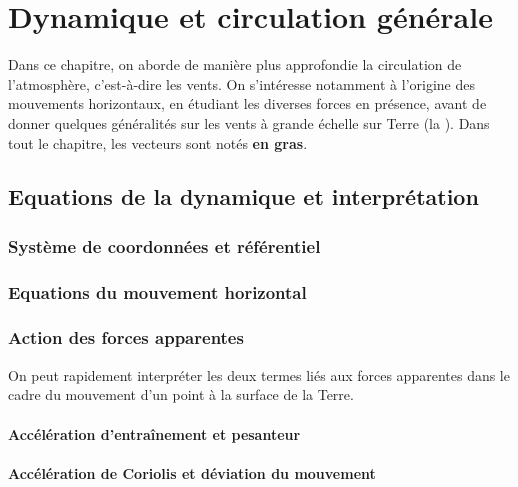 \chapter{Dynamique et circulation générale}


\bk
Dans ce chapitre, on aborde de manière plus approfondie la circulation de l'atmosphère, c'est-à-dire les vents. On s'intéresse notamment à l'origine des mouvements horizontaux, en étudiant les diverses forces en présence, avant de donner quelques généralités sur les vents à grande échelle sur Terre (la ). Dans tout le chapitre, les vecteurs sont notés \textbf{en gras}.

\mk 
\section{Equations de la dynamique et interprétation}

\sk
\subsection{Système de coordonnées et référentiel}

	

\sk
\subsection{Equations du mouvement horizontal}

	

\sk
\subsection{Action des forces apparentes}

\sk
On peut rapidement interpréter les deux termes liés aux forces apparentes dans le cadre du mouvement d'un point à la surface de la Terre.

\sk
\subsubsection{Accélération d'entraînement et pesanteur}

	

\sk
\subsubsection{Accélération de Coriolis et déviation du mouvement}

